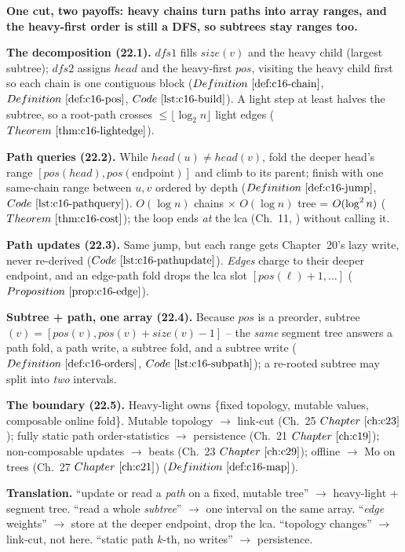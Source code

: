 
\begin{quickref}
\textbf{One cut, two payoffs: heavy chains turn paths into array ranges, and the heavy-first
order is still a DFS, so subtrees stay ranges too. }

\medskip
\textbf{The decomposition (22.1).} \(\mathit{dfs1}\) fills \(\mathit{size}(v)\) and the heavy
child (largest subtree); \(\mathit{dfs2}\) assigns \(\mathit{head}\) and the heavy-first
\(\mathit{pos}\), visiting the heavy child first so each chain is one contiguous block
(\(\defref{c16-chain}\), \(\defref{c16-pos}\), \(\coderef{c16-build}\)). A light step at least
halves the subtree, so a root-path crosses \(\le\lfloor\log_2 n\rfloor\) light edges
(\(\thmref{c16-lightedge}\)).

\medskip
\textbf{Path queries (22.2).} While \(\mathit{head}(u)\ne\mathit{head}(v)\), fold the deeper
head's range \([\mathit{pos}(\mathit{head}),\mathit{pos}(\text{endpoint})]\) and climb to its
parent; finish with one same-chain range between \(u,v\) ordered by depth (\(\defref{c16-jump}\),
\(\coderef{c16-pathquery}\)). \(O(\log n)\) chains \(\times\) \(O(\log n)\) tree = \(O(\log^2 n)\)
(\(\thmref{c16-cost}\)); the loop ends \emph{at} the lca (Ch.~11, ) without calling it.

\medskip
\textbf{Path updates (22.3).} Same jump, but each range gets Chapter~20's lazy write, never
re-derived (\(\coderef{c16-pathupdate}\)). \emph{Edges} charge to their deeper endpoint, and an
edge-path fold drops the lca slot \([\mathit{pos}(\ell)+1,\dots]\) (\(\propref{c16-edge}\)).

\medskip
\textbf{Subtree + path, one array (22.4).} Because \(\mathit{pos}\) is a preorder, subtree\((v)=
[\mathit{pos}(v),\mathit{pos}(v)+\mathit{size}(v)-1]\) -- the \emph{same} segment tree answers a
path fold, a path write, a subtree fold, and a subtree write (\(\defref{c16-orders}\),
\(\coderef{c16-subpath}\)); a re-rooted subtree may split into \emph{two} intervals.

\medskip
\textbf{The boundary (22.5).} Heavy-light owns \{fixed topology, mutable values, composable
online fold\}. Mutable topology \(\to\) link-cut (Ch.~25 \(\chref{c23}\)); fully static path
order-statistics \(\to\) persistence (Ch.~21 \(\chref{c19}\)); non-composable updates
\(\to\) beats (Ch.~23 \(\chref{c29}\)); offline \(\to\) Mo on trees (Ch.~27 \(\chref{c21}\))
(\(\defref{c16-map}\)).

\medskip
\textbf{Translation.} ``update or read a \emph{path} on a fixed, mutable tree'' \(\to\) heavy-light
+ segment tree. ``read a whole \emph{subtree}'' \(\to\) one interval on the same array.
``\emph{edge} weights'' \(\to\) store at the deeper endpoint, drop the lca. ``topology changes''
\(\to\) link-cut, not here. ``static path \(k\)-th, no writes'' \(\to\) persistence.
\end{quickref}


